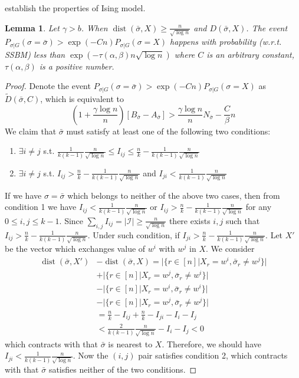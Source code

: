 \documentclass[journal]{IEEEtran}
\newtheorem{lemma}{Lemma}
\newcommand{\cI}{\mathcal{I}}
\newcommand{\1}{\mathbbm{1}}
\DeclareMathOperator{\dist}{dist}
\begin{document}
establish the properties of Ising model.
\begin{lemma}\label{lem:sigmaX}
	Let $\gamma > b$. When $\dist(\bar{\sigma}, X) \geq \frac{n}{\sqrt{\log n}}$ and $D(\bar{\sigma}, X)$. The event
	$P_{\sigma | G}(\sigma = \bar{\sigma} ) > \exp(-Cn) P_{\sigma | G}(\sigma = X)$
	happens with probability (w.r.t. SSBM) less than $\exp(-\tau(\alpha,\beta) n \sqrt{\log  n} )$ where $C$ is an arbitrary constant, $\tau(\alpha,\beta)$ is a positive number.
\end{lemma}
\begin{proof}
	Denote the event $P_{\sigma | G}(\sigma = \bar{\sigma} ) > \exp(-Cn) P_{\sigma | G}(\sigma = X)$ as $\widetilde{D}(\bar{\sigma}, C)$,
	which is equivalent to
	\begin{equation}\label{eq:BwA}
	(1 + \frac{\gamma \log n}{n})[B_{\bar{\sigma}} - A_{\bar{\sigma}}] >  \frac{\gamma \log n}{n} N_{\bar{\sigma}}  - \frac{C}{\beta} n
	\end{equation}
	We claim that $\bar{\sigma}$ must satisfy at least one of the following two conditions:
	\begin{enumerate}
		\item $\exists i\neq j$ s.t. $\frac{1}{k(k-1)}\frac{n}{\sqrt{\log n}} \leq I_{ij} \leq \frac{n}{k} - \frac{1}{k(k-1)}\frac{n}{\sqrt{\log n}}$
		\item $\exists i \neq j$ s.t. $I_{ij} > \frac{n}{k} - \frac{1}{k(k-1)}\frac{n}{\sqrt{\log n}}$ and $I_{ji} < \frac{1}{k(k-1)}\frac{n}{\sqrt{\log n}}$
	\end{enumerate}
	If we have $\sigma = \bar{\sigma}$ which belongs to neither of the above two cases, then from condition 1 we have
	$I_{ij} < \frac{1}{k(k-1)}\frac{n}{\sqrt{\log n}}$ or $I_{ij} > \frac{n}{k} - \frac{1}{k(k-1)}\frac{n}{\sqrt{\log n}}$ for any $0 \leq i,j\leq k-1$.
	Since $\sum_{i,j} I_{ij} = |\cI| \geq \frac{n}{\sqrt{\log n}}$ there exists $i,j$ such that $I_{ij} > \frac{n}{k} - \frac{1}{k(k-1)}\frac{n}{\sqrt{\log n}}$.
	Under such condition, if $I_{ji} > \frac{n}{k} - \frac{1}{k(k-1)}\frac{n}{\sqrt{\log n}}$.
	Let $X'$ be the vector which exchanges value of $w^i$ with $w^j$ in $X$. We consider
	\begin{align*}
	 \dist(\bar{\sigma}, X') & - \dist(\bar{\sigma}, X)= |\{ r \in [n]|X_r=w^i, \bar{\sigma}_r \neq w^j \}| \\
	&+ |\{ r \in [n]|X_r=w^j, \bar{\sigma}_r \neq w^i \}| \\
	&-|\{ r \in [n]|X_r=w^i, \bar{\sigma}_r \neq w^i \}| \\
	&- |\{ r \in [n]|X_r=w^j, \bar{\sigma}_r \neq w^j \}| \\
	& = \frac{n}{k} - I_{ij} +  \frac{n}{k} - I_{ji} - I_i - I_j \\
	& < \frac{2}{k(k-1)}\frac{n}{\sqrt{\log n}} - I_i - I_j < 0
	\end{align*}
	which contracts with that $\bar{\sigma}$ is nearest to $X$.
	Therefore, we should have $I_{ji} < \frac{1}{k(k-1)}\frac{n}{\sqrt{\log n}}$.
	Now the $(i, j)$ pair satisfies condition 2, which contracts with that $\bar{\sigma}$ satisfies neither of the two conditions.
	

\end{proof}
\end{document}

